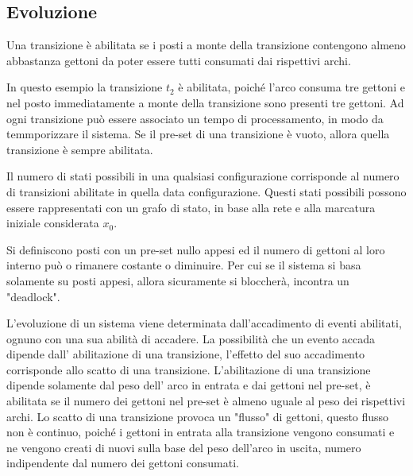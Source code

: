 \documentclass{article}
\numberwithin{equation}{subsection}
\begin{document}
\subsection{Evoluzione}

Una transizione è abilitata se i posti a monte della transizione contengono almeno abbastanza gettoni da poter essere tutti consumati dai rispettivi archi. 

\begin{center}
\end{center}

In questo esempio la transizione $t_2$ è abilitata, poiché l'arco consuma tre gettoni e nel posto immediatamente a monte della transizione sono presenti tre gettoni. 
Ad ogni transizione può essere associato un tempo di processamento, in modo da temmporizzare il sistema. Se il pre-set di una transizione è vuoto, allora quella transizione 
è sempre abilitata. 

Il numero di stati possibili in una qualsiasi configurazione corrisponde al numero di transizioni abilitate in quella data configurazione. Questi stati possibili possono 
essere rappresentati con un grafo di stato, in base alla rete e alla marcatura iniziale considerata $x_0$. 

Si definiscono posti con un pre-set nullo appesi ed il numero di gettoni al loro interno può o rimanere costante o diminuire. Per cui se il sistema si basa solamente su posti 
appesi, allora sicuramente si bloccherà, incontra un "deadlock". 


L'evoluzione di un sistema viene determinata dall'accadimento di eventi abilitati, ognuno con una sua abilità di accadere. La possibilità che un evento accada dipende dall'
abilitazione di una transizione, l'effetto del suo accadimento corrisponde allo scatto di una transizione. L'abilitazione di una transizione dipende solamente dal peso dell'
arco in entrata e dai gettoni nel pre-set, è abilitata se il numero dei gettoni nel pre-set è almeno uguale al peso dei rispettivi archi. 
Lo scatto di una transizione provoca un "flusso" di gettoni, questo flusso non è continuo, poiché i gettoni in entrata alla transizione vengono consumati e ne vengono creati 
di nuovi sulla base del peso dell'arco in uscita, numero indipendente dal numero dei gettoni consumati. 
\end{document}
